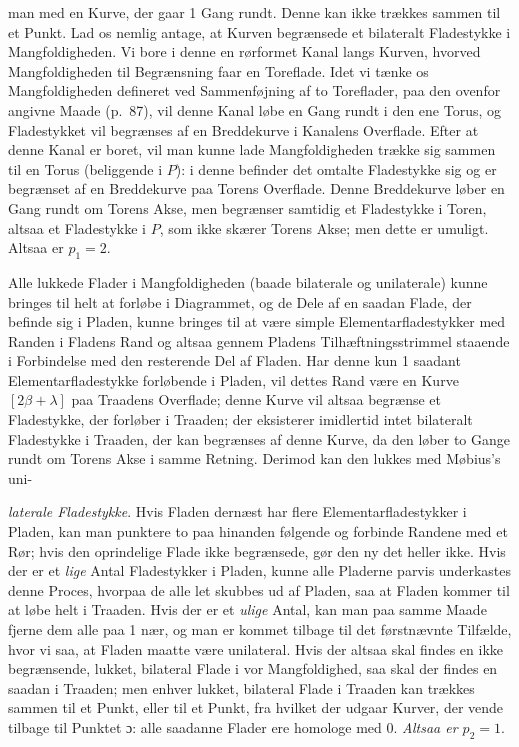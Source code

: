\documentclass{article}
\begin{document}
man med en Kurve, der gaar 1 Gang rundt. Denne kan ikke trækkes sammen til et Punkt. Lad os nemlig antage, at Kurven begrænsede et bilateralt Fladestykke i Mangfoldigheden. Vi bore i denne en rørformet Kanal langs Kurven, hvorved Mangfoldigheden til Begrænsning faar en Toreflade. Idet vi tænke os Mangfoldigheden defineret ved Sammenføjning af to Toreflader, paa den ovenfor angivne Maade (p.\ 87), vil denne Kanal løbe en Gang rundt i den ene Torus, og Fladestykket vil begrænses af en Breddekurve i Kanalens Overflade. Efter at denne Kanal er boret, vil man kunne lade Mangfoldigheden trække sig sammen til en Torus (beliggende i $P$): i denne befinder det omtalte Fladestykke sig og er begrænset af en Breddekurve paa Torens Overflade. Denne Breddekurve løber en Gang rundt om Torens Akse, men begrænser samtidig et Fladestykke i Toren, altsaa et Fladestykke i $P$, som ikke skærer Torens Akse; men dette er umuligt. Altsaa er $p_1 = 2$.

Alle lukkede Flader i Mangfoldigheden (baade bilaterale og unilaterale) kunne bringes til helt at forløbe i Diagrammet, og de Dele af en saadan Flade, der befinde sig i Pladen, kunne bringes til at være simple Elementarfladestykker med Randen i Fladens Rand og altsaa gennem Pladens Tilhæftningsstrimmel staaende i Forbindelse med den resterende Del af Fladen. Har denne kun 1 saadant Elementarfladestykke forløbende i Pladen, vil dettes Rand være en Kurve $[2\beta + \lambda]$ paa Traadens Overflade; denne Kurve vil altsaa begrænse et Fladestykke, der forløber i Traaden; der eksisterer imidlertid intet bilateralt Fladestykke i Traaden, der kan begrænses af denne Kurve, da den løber to Gange rundt om Torens Akse i samme Retning. Derimod kan den lukkes med Møbius's uni-

\emph{laterale Fladestykke}. Hvis Fladen dernæst har flere Elementarfladestykker i Pladen, kan man punktere to paa hinanden følgende og forbinde Randene med et Rør; hvis den oprindelige Flade ikke begrænsede, gør den ny det heller ikke. Hvis der er et \emph{lige} Antal Fladestykker i Pladen, kunne alle Pladerne parvis underkastes denne Proces, hvorpaa de alle let skubbes ud af Pladen, saa at Fladen kommer til at løbe helt i Traaden. Hvis der er et \emph{ulige} Antal, kan man paa samme Maade fjerne dem alle paa 1 nær, og man er kommet tilbage til det førstnævnte Tilfælde, hvor vi saa, at Fladen maatte være unilateral. Hvis der altsaa skal findes en ikke begrænsende, lukket, bilateral Flade i vor Mangfoldighed, saa skal der findes en saadan i Traaden; men enhver lukket, bilateral Flade i Traaden kan trækkes sammen til et Punkt, eller til et Punkt, fra hvilket der udgaar Kurver, der vende tilbage til Punktet ɔ: alle saadanne Flader ere homologe med 0. \emph{Altsaa er $p_2 = 1$}.
\end{document}
